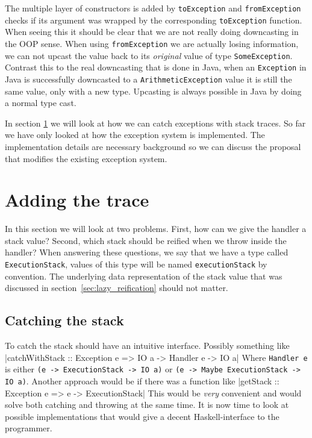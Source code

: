 The multiple layer of constructors is added by \texttt{toException}
and \texttt{fromException} checks if its argument was wrapped by the
corresponding \texttt{toException} function. When seeing this it should
be clear that we are not really doing downcasting in the OOP sense. When using
\texttt{fromException} we are actually losing information, we
can not upcast the value back to its \emph{original} value of type
\texttt{SomeException}. Contrast this to the real downcasting that is
done in Java, when an \texttt{Exception} in Java is successfully
downcasted to a \texttt{ArithmeticException} value it is still the same
value, only with a new type. Upcasting is always possible in Java by
doing a normal type cast.

In section \ref{sec:adding_the_trace} we will look at how we can
catch exceptions with stack traces. So far we have only looked at how
the exception system is implemented. The implementation details are
necessary background so we can discuss the proposal that modifies the
existing exception system.

\section{Adding the trace} \label{sec:adding_the_trace}

In this section we will look at two problems. First, how can we give
the handler a stack value? Second, which stack should be reified
when we throw inside the handler? When answering these questions, we
say that we have a type called \texttt{ExecutionStack}, values of
this type will be named \texttt{executionStack} by convention. The
underlying data representation of the stack value that was discussed in
section~\ref{sec:lazy_reification} should not matter.

\subsection{Catching the stack}


To catch the stack should have an intuitive interface. Possibly
something like
|catchWithStack :: Exception e => IO a -> Handler e -> IO a|
Where \texttt{Handler e} is either \texttt{(e -> ExecutionStack -> IO a)} or
\texttt{(e -> Maybe ExecutionStack -> IO a)}. Another approach would be
if there was a function like
|getStack :: Exception e => e -> ExecutionStack|
This would be \emph{very} convenient and would solve both catching and
throwing at the same time. It is now time to look at possible
implementations
that would give a decent Haskell-interface to the programmer.

